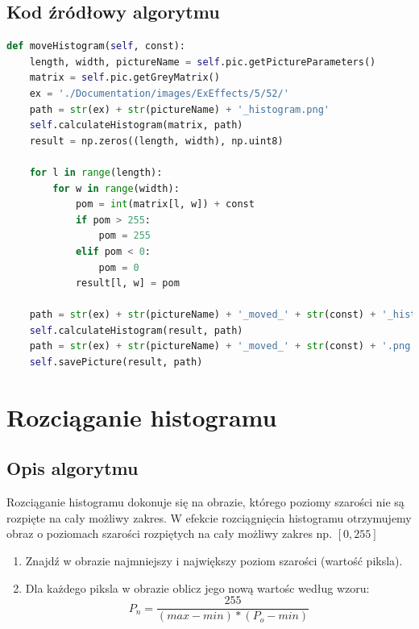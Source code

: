 \documentclass[a4paper,12pt, titlepage]{report}
\begin{document}
\subsection*{Kod źródłowy algorytmu}
\begin{lstlisting}[language=Python]
def moveHistogram(self, const):
    length, width, pictureName = self.pic.getPictureParameters()
    matrix = self.pic.getGreyMatrix()
    ex = './Documentation/images/ExEffects/5/52/'
    path = str(ex) + str(pictureName) + '_histogram.png'
    self.calculateHistogram(matrix, path)
    result = np.zeros((length, width), np.uint8)

    for l in range(length):
        for w in range(width):
            pom = int(matrix[l, w]) + const
            if pom > 255:
                pom = 255
            elif pom < 0:
                pom = 0
            result[l, w] = pom

    path = str(ex) + str(pictureName) + '_moved_' + str(const) + '_histogram.png'
    self.calculateHistogram(result, path)
    path = str(ex) + str(pictureName) + '_moved_' + str(const) + '.png'
    self.savePicture(result, path)
\end{lstlisting}

\section{Rozciąganie histogramu}
\subsection*{Opis algorytmu}
\par Rozciąganie histogramu dokonuje się na obrazie, którego poziomy szarości nie są rozpięte na cały możliwy zakres. W efekcie rozciągnięcia histogramu otrzymujemy obraz o poziomach szarości rozpiętych na cały możliwy zakres np. \([0,255]\)
\begin{enumerate}
\item Znajdź w obrazie najmniejszy i największy poziom szarości (wartość piksla).
\item Dla każdego piksla w obrazie oblicz jego nową wartośc według wzoru: \[P_{n}=\frac{255}{(max-min)*(P_{o}-min)}\]
\end{enumerate}
\end{document}
